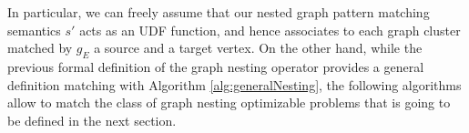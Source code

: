

In particular, we can freely assume that our nested graph pattern matching semantics $s'$ acts as an UDF function, and hence associates to each graph cluster matched by $g_E$ a source and a target vertex. On the other hand, while the previous formal definition of the graph nesting operator provides a general definition matching with Algorithm \vref{alg:generalNesting}, the following  algorithms allow to match the class of graph nesting optimizable problems that is going to be defined in the next section.